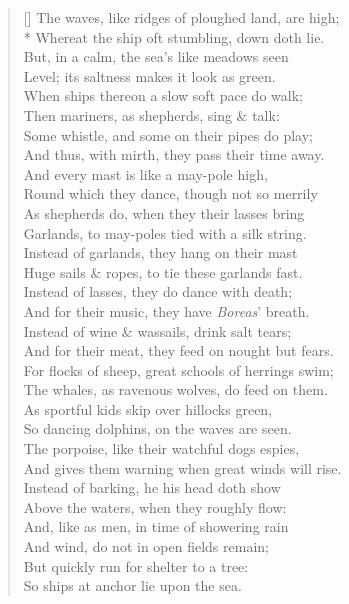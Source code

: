 \documentclass[MAIN]{subfiles}
\begin{document}
\settowidth{\versewidth}{The waves, like ridges of ploughed land, are high;}
\begin{verse}[\versewidth]
The waves, like ridges of ploughed land, are high;\\*
Whereat the ship oft stumbling, down doth lie.\\
But, in a calm, the sea's like meadows seen\\
Level; its saltness makes it look as green.\\
When ships thereon a slow soft pace do walk;\\
Then mariners, as shepherds, sing \& talk:\\
Some whistle, and some on their pipes do play;\\
And thus, with mirth, they pass their time away.\\
And every mast is like a may-pole high,\\
Round which they dance, though not so merrily\\
As shepherds do, when they their lasses bring\\
Garlands, to may-poles tied with a silk string.\\
Instead of garlands, they hang on their mast\\
Huge sails \& ropes, to tie these garlands fast.\\
Instead of lasses, they do dance with death;\\
And for their music, they have \emph{Boreas}' breath.\\
Instead of wine \& wassails, drink salt tears;\\
And for their meat, they feed on nought but fears.\\
For flocks of sheep, great schools of herrings swim;\\
The whales, as ravenous wolves, do feed on them.\\
As sportful kids skip over hillocks green,\\
So dancing dolphins, on the waves are seen.\\
The porpoise, like their watchful dogs espies,\\
And gives them warning when great winds will rise.\\
Instead of barking, he his head doth show\\
Above the waters, when they roughly flow:\\
And, like as men, in time of showering rain\\
And wind, do not in open fields remain;\\
But quickly run for shelter to a tree:\\
So ships at anchor lie upon the sea.
\end{verse}
\end{document}
